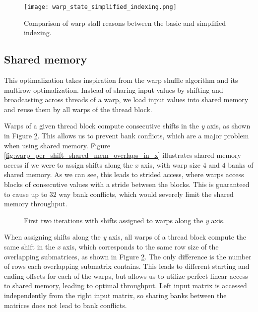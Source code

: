 \begin{figure}[ht]
	\centering
	\texttt{[image: warp\_state\_simplified\_indexing.png]}
	\caption{Comparison of warp stall reasons between the basic and simplified indexing.}
	\label{fig:warp_state_simplified_indexing}
\end{figure}

\subsection{Shared memory}
\label{sec:warp_per_shift_shared_mem}

This optimalization takes inspiration from the warp shuffle algorithm and its multirow optimalization. Instead of sharing input values by shifting and broadcasting across threads of a warp, we load input values into shared memory and reuse them by all warps of the thread block.

Warps of a given thread block compute consecutive shifts in the \textit{y} axis, as shown in Figure \ref{fig:warp_per_shift_shared_mem_shifts}. This allows us to prevent bank conflicts, which are a major problem when using shared memory. Figure \ref{fig:warp_per_shift_shared_mem_overlaps_in_x} illustrates shared memory access if we were to assign shifts along the \textit{x} axis, with warp size 4 and 4 banks of shared memory. As we can see, this leads to strided access, where warps access blocks of consecutive values with a stride between the blocks. This is guaranteed to cause up to 32 way bank conflicts, which would severely limit the shared memory throughput.

\begin{figure}[ht]
	\centering
	\def\svgwidth{\textwidth}
	
	\caption{First two iterations with shifts assigned to warps along the \textit{y} axis.}
	\label{fig:warp_per_shift_shared_mem_shifts}
\end{figure}

When assigning shifts along the \textit{y} axis, all warps of a thread block compute the same shift in the \textit{x} axis, which corresponds to the same row size of the overlapping submatrices, as shown in Figure \ref{fig:warp_per_shift_shared_mem_shifts}. The only difference is the number of rows each overlapping submatrix contains. This leads to different starting and ending offsets for each of the warps, but allows us to utilize perfect linear access to shared memory, leading to optimal throughput. Left input matrix is accessed independently from the right input matrix, so sharing banks between the matrices does not lead to bank conflicts.

